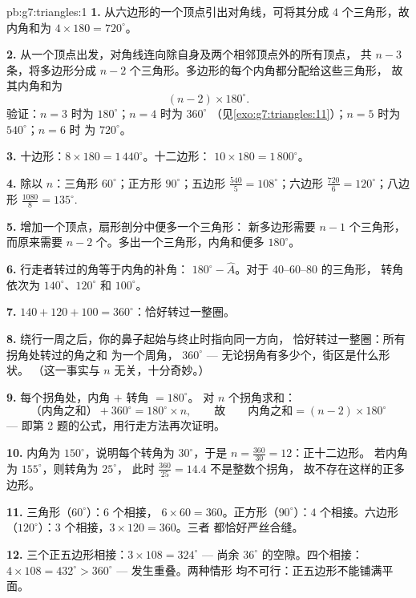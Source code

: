 \begin{solution}{pb:g7:triangles:1}
\textbf{1.} 从六边形的一个顶点引出对角线，可将其分成
$4$ 个三角形，故内角和为
$4 \times 180 = 720^\circ$。

\textbf{2.} 从一个顶点出发，对角线连向除自身及两个相邻顶点外的所有顶点，
共 $n - 3$ 条，将多边形分成
$n - 2$ 个三角形。多边形的每个内角都分配给这些三角形，
故其内角和为
\[
(n - 2) \times 180^\circ .
\]
验证：$n = 3$ 时为 $180^\circ$；$n = 4$ 时为 $360^\circ$
（见\cref{exo:g7:triangles:11}）；$n = 5$ 时为 $540^\circ$；$n = 6$ 时
为 $720^\circ$。

\textbf{3.} 十边形：$8 \times 180 = 1\,440^\circ$。十二边形：
$10 \times 180 = 1\,800^\circ$。

\textbf{4.} 除以 $n$：三角形 $60^\circ$；正方形
$90^\circ$；五边形 $\frac{540}{5} = 108^\circ$；六边形
$\frac{720}{6} = 120^\circ$；八边形 $\frac{1080}{8} =
135^\circ$.

\textbf{5.} 增加一个顶点，扇形剖分中便多一个三角形：
新多边形需要 $n - 1$ 个三角形，而原来需要
$n - 2$ 个。多出一个三角形，内角和便多 $180^\circ$。

\textbf{6.} 行走者转过的角等于内角的补角：
$180^\circ - \widehat A$。对于 $40$--$60$--$80$ 的三角形，
转角依次为 $140^\circ$、$120^\circ$ 和 $100^\circ$。

\textbf{7.} $140 + 120 + 100 = 360^\circ$：恰好转过一整圈。

\textbf{8.} 绕行一周之后，你的鼻子起始与终止时指向同一方向，
恰好转过一整圈：所有拐角处转过的角之和
为一个周角，
$360^\circ$ --- 无论拐角有多少个，街区是什么形状。
（这一事实与 $n$ 无关，十分奇妙。）

\textbf{9.} 每个拐角处，内角 $+$ 转角 $= 180^\circ$。
对 $n$ 个拐角求和：
\[
\text{（内角之和）} + 360^\circ = 180^\circ \times n,
\qquad\text{故}\qquad
\text{内角之和} = (n - 2) \times 180^\circ
\]
--- 即第 2 题的公式，用行走方法再次证明。

\textbf{10.} 内角为 $150^\circ$，说明每个转角为
$30^\circ$，于是 $n = \frac{360}{30} = 12$：正十二边形。
若内角为 $155^\circ$，则转角为 $25^\circ$，
此时 $\frac{360}{25} = 14.4$ 不是整数个拐角，
故不存在这样的正多边形。

\textbf{11.} 三角形（$60^\circ$）：$6$ 个相接，
$6 \times 60 = 360$。正方形（$90^\circ$）：$4$ 个相接。六边形
（$120^\circ$）：$3$ 个相接，$3 \times 120 = 360$。三者
都恰好严丝合缝。

\textbf{12.} 三个正五边形相接：$3 \times 108 = 324^\circ$
--- 尚余 $36^\circ$ 的空隙。四个相接：
$4 \times 108 = 432^\circ > 360^\circ$ --- 发生重叠。两种情形
均不可行：正五边形不能铺满平面。


\end{solution}

